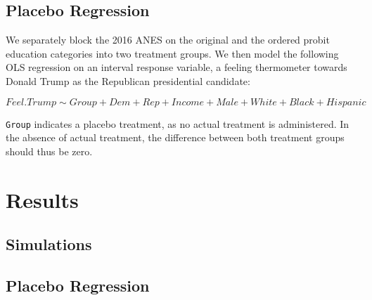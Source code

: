 \documentclass[12pt,econ]{sources/authesis}
\begin{document}
\hypertarget{ordblock-data-plac}{%
\subsection{Placebo Regression}\label{ordblock-data-plac}}

We separately block the 2016 ANES on the original and the ordered probit education categories into two treatment groups. We then model the following OLS regression on an interval response variable, a feeling thermometer towards Donald Trump as the Republican presidential candidate:

\vspace{-1cm}

\[Feel.Trump \sim Group + Dem + Rep + Income + Male + White + Black + Hispanic\]

\texttt{Group} indicates a placebo treatment, as no actual treatment is administered. In the absence of actual treatment, the difference between both treatment groups should thus be zero.

\hypertarget{ordblock-results}{%
\section{Results}\label{ordblock-results}}

\hypertarget{ordblock-results-sims}{%
\subsection{Simulations}\label{ordblock-results-sims}}

\hypertarget{ordblock-results-plac}{%
\subsection{Placebo Regression}\label{ordblock-results-plac}}
\end{document}
